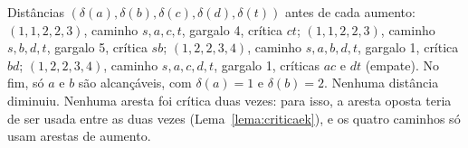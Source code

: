  Distâncias $(\delta(a),\delta(b),\delta(c),\delta(d),\delta(t))$ antes de cada aumento: $(1,1,2,2,3)$, caminho $s,a,c,t$, gargalo 4, crítica $ct$; $(1,1,2,2,3)$, caminho $s,b,d,t$, gargalo 5, crítica $sb$; $(1,2,2,3,4)$, caminho $s,a,b,d,t$, gargalo 1, crítica $bd$; $(1,2,2,3,4)$, caminho $s,a,c,d,t$, gargalo 1, críticas $ac$ e $dt$ (empate). No fim, só $a$ e $b$ são alcançáveis, com $\delta(a)=1$ e $\delta(b)=2$. Nenhuma distância diminuiu. Nenhuma aresta foi crítica duas vezes: para isso, a aresta oposta teria de ser usada entre as duas vezes (Lema~\ref{lema:criticaek}), e os quatro caminhos só usam arestas de aumento.
